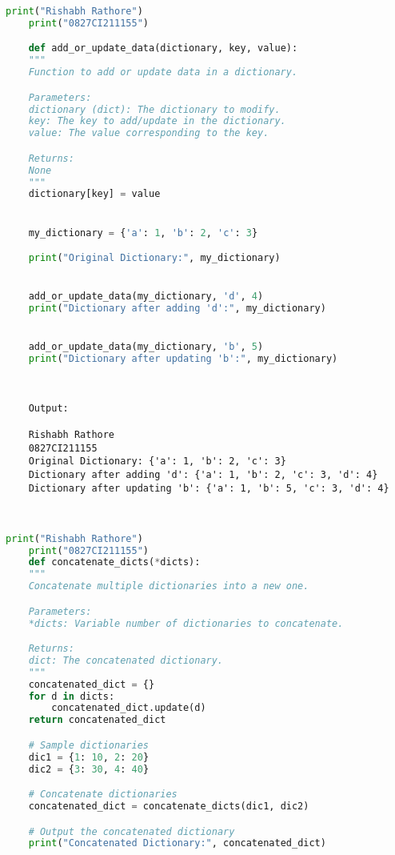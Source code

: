 \documentclass{report}
\begin{document}
\bigskip


\sol 
\begin{lstlisting}[language=Python]
	print("Rishabh Rathore")
	print("0827CI211155")

	def add_or_update_data(dictionary, key, value):
    """
    Function to add or update data in a dictionary.

    Parameters:
    dictionary (dict): The dictionary to modify.
    key: The key to add/update in the dictionary.
    value: The value corresponding to the key.

    Returns:
    None
    """
    dictionary[key] = value


	my_dictionary = {'a': 1, 'b': 2, 'c': 3}

	print("Original Dictionary:", my_dictionary)


	add_or_update_data(my_dictionary, 'd', 4)
	print("Dictionary after adding 'd':", my_dictionary)


	add_or_update_data(my_dictionary, 'b', 5)
	print("Dictionary after updating 'b':", my_dictionary)

  

\end{lstlisting}

\begin{verbatim}
	Output:

	Rishabh Rathore
	0827CI211155
	Original Dictionary: {'a': 1, 'b': 2, 'c': 3}
	Dictionary after adding 'd': {'a': 1, 'b': 2, 'c': 3, 'd': 4}
	Dictionary after updating 'b': {'a': 1, 'b': 5, 'c': 3, 'd': 4}

	

\end{verbatim}


\bigskip


\sol 
\begin{lstlisting}[language=Python]
	print("Rishabh Rathore")
	print("0827CI211155")
	def concatenate_dicts(*dicts):
    """
    Concatenate multiple dictionaries into a new one.

    Parameters:
    *dicts: Variable number of dictionaries to concatenate.

    Returns:
    dict: The concatenated dictionary.
    """
    concatenated_dict = {}
    for d in dicts:
        concatenated_dict.update(d)
    return concatenated_dict

	# Sample dictionaries
	dic1 = {1: 10, 2: 20}
	dic2 = {3: 30, 4: 40}

	# Concatenate dictionaries
	concatenated_dict = concatenate_dicts(dic1, dic2)

	# Output the concatenated dictionary
	print("Concatenated Dictionary:", concatenated_dict)


\end{lstlisting}
\end{document}
